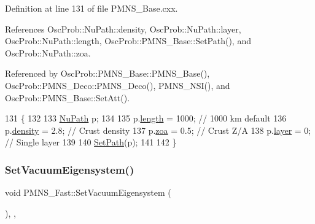 Definition at line 131 of file P\+M\+N\+S\+\_\+\+Base.\+cxx.



References Osc\+Prob\+::\+Nu\+Path\+::density, Osc\+Prob\+::\+Nu\+Path\+::layer, Osc\+Prob\+::\+Nu\+Path\+::length, Osc\+Prob\+::\+P\+M\+N\+S\+\_\+\+Base\+::\+Set\+Path(), and Osc\+Prob\+::\+Nu\+Path\+::zoa.



Referenced by Osc\+Prob\+::\+P\+M\+N\+S\+\_\+\+Base\+::\+P\+M\+N\+S\+\_\+\+Base(), Osc\+Prob\+::\+P\+M\+N\+S\+\_\+\+Deco\+::\+P\+M\+N\+S\+\_\+\+Deco(), P\+M\+N\+S\+\_\+\+N\+S\+I(), and Osc\+Prob\+::\+P\+M\+N\+S\+\_\+\+Base\+::\+Set\+Att().


\begin{DoxyCode}
131                           \{
132 
133   \hyperlink{structOscProb_1_1NuPath}{NuPath} p;
134 
135   p.\hyperlink{structOscProb_1_1NuPath_af22660894b6e25cf835500381b155557}{length}  = 1000; \textcolor{comment}{// 1000 km default}
136   p.\hyperlink{structOscProb_1_1NuPath_a54ddd451db69bc54434de3cf18a117ca}{density} = 2.8;  \textcolor{comment}{// Crust density}
137   p.\hyperlink{structOscProb_1_1NuPath_af3213f3691ba83c6bc05f4a3490f6b31}{zoa}     = 0.5;  \textcolor{comment}{// Crust Z/A}
138   p.\hyperlink{structOscProb_1_1NuPath_a442b160899e554ad1d800989510d5309}{layer}   = 0;    \textcolor{comment}{// Single layer}
139 
140   \hyperlink{classOscProb_1_1PMNS__Base_ac3b644fd0a56347d304ceca4ae9d8875}{SetPath}(p);
141 
142 \}
\end{DoxyCode}
\mbox{\label{classOscProb_1_1PMNS__Fast_a76dd5a761df8689c502b28ad0391f9e2}} 
\subsubsection{\texorpdfstring{Set\+Vacuum\+Eigensystem()}{SetVacuumEigensystem()}}
{\footnotesize\ttfamily void P\+M\+N\+S\+\_\+\+Fast\+::\+Set\+Vacuum\+Eigensystem (\begin{DoxyParamCaption}{ }\end{DoxyParamCaption})\hspace{0.3cm}{\ttfamily [protected]}, {\ttfamily [virtual]}, {\ttfamily [inherited]}}


